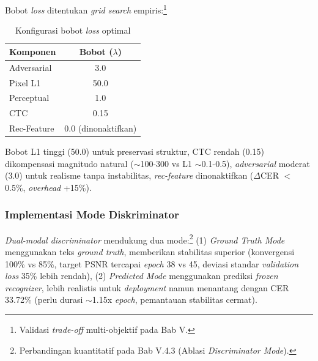 \documentclass[12pt,a4paper]{book}
\begin{document}
Bobot \textit{loss} ditentukan \textit{grid search} empiris:\footnote{Validasi \textit{trade-off} multi-objektif pada Bab V.}

\begin{table}[H]
\centering
\caption{Konfigurasi bobot \textit{loss} optimal}
\label{tab:loss-weights}
\small
\begin{tabular}{|l|c|}
\hline
\textbf{Komponen} & \textbf{Bobot ($\lambda$)} \\
\hline
Adversarial & 3.0 \\
Pixel L1 & 50.0 \\
Perceptual & 1.0 \\
CTC & 0.15 \\
Rec-Feature & 0.0 (dinonaktifkan) \\
\hline
\end{tabular}
\end{table}

Bobot L1 tinggi (50.0) untuk preservasi struktur, CTC rendah (0.15) dikompensasi magnitudo natural ($\sim$100-300 vs L1 $\sim$0.1-0.5), \textit{adversarial} moderat (3.0) untuk realisme tanpa instabilitas, \textit{rec-feature} dinonaktifkan ($\Delta$CER $<$0.5\%, \textit{overhead} +15\%).


\subsubsection{Implementasi Mode Diskriminator}
\label{subsubsec:discriminator-mode-impl}

\textit{Dual-modal discriminator} mendukung dua mode:\footnote{Perbandingan kuantitatif pada Bab V.4.3 (Ablasi \textit{Discriminator Mode}).} (1) \textit{Ground Truth Mode} menggunakan teks \textit{ground truth}, memberikan stabilitas superior (konvergensi 100\% vs 85\%, target PSNR tercapai \textit{epoch} 38 vs 45, deviasi standar \textit{validation loss} 35\% lebih rendah), (2) \textit{Predicted Mode} menggunakan prediksi \textit{frozen recognizer}, lebih realistis untuk \textit{deployment} namun menantang dengan CER 33.72\% (perlu durasi $\sim$1.15x \textit{epoch}, pemantauan stabilitas cermat).
\end{document}
